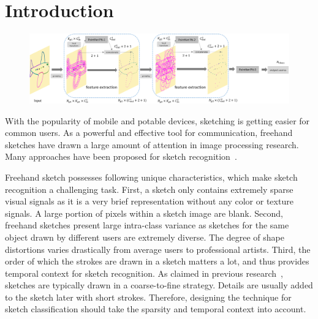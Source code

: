 \section{Introduction}
\label{sec:intro}


 \begin{figure}
 	\center
 	\includegraphics[width=\textwidth]{images/sketchpointnet.png}
 	\label{fig:sketchpointnet}
 \end{figure}


With the popularity of mobile and potable devices, sketching is getting easier for common users. As a powerful and effective tool for communication, freehand sketches have drawn a large amount of attention in image processing research.
Many approaches have been proposed for sketch recognition~\cite{Eitz2012HowDH, LiHSG15, Schneider2014SketchCA, Yu2015SketchaNetTB, Seddati2015DeepSketchDC, Dupont2016DeepSketch2D}.


Freehand sketch possesses following unique characteristics, which make sketch recognition a challenging task. 
%
First, a sketch only contains extremely sparse visual signals as it is a very brief representation without any color or texture signals.
A large portion of pixels within a sketch image are blank.
%
Second, freehand sketches present large intra-class variance as sketches for the same object drawn by different users are extremely diverse.
The degree of shape distortions varies drastically from average users to professional artists.
%
Third, the order of which the strokes are drawn in a sketch matters a lot, and thus provides temporal context for sketch recognition.
As claimed in previous research~\cite{Eitz2012HowDH}, sketches are typically drawn in a coarse-to-fine strategy.
Details are usually added to the sketch later with short strokes.
Therefore, designing the technique for sketch classification should take the sparsity and temporal context into account.



